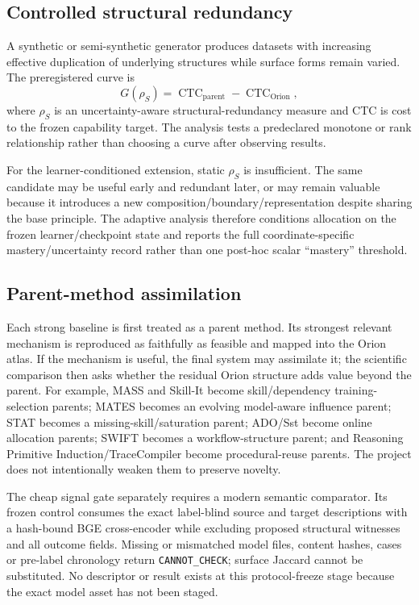 \subsection{Controlled structural redundancy}

A synthetic or semi-synthetic generator produces datasets with increasing effective duplication of underlying structures while surface forms remain varied. The preregistered curve is
\[
G(\rho_S)=\operatorname{CTC}_{\mathrm{parent}}-\operatorname{CTC}_{\mathrm{Orion}},
\]
where $\rho_S$ is an uncertainty-aware structural-redundancy measure and CTC is cost to the frozen capability target. The analysis tests a predeclared monotone or rank relationship rather than choosing a curve after observing results.

For the learner-conditioned extension, static $\rho_S$ is insufficient. The same candidate may be useful early and redundant later, or may remain valuable because it introduces a new composition/boundary/representation despite sharing the base principle. The adaptive analysis therefore conditions allocation on the frozen learner/checkpoint state and reports the full coordinate-specific mastery/uncertainty record rather than one post-hoc scalar ``mastery'' threshold.

\subsection{Parent-method assimilation}

Each strong baseline is first treated as a parent method. Its strongest relevant mechanism is reproduced as faithfully as feasible and mapped into the Orion atlas. If the mechanism is useful, the final system may assimilate it; the scientific comparison then asks whether the residual Orion structure adds value beyond the parent. For example, MASS and Skill-It become skill/dependency training-selection parents; MATES becomes an evolving model-aware influence parent; STAT becomes a missing-skill/saturation parent; ADO/Sst become online allocation parents; SWIFT becomes a workflow-structure parent; and Reasoning Primitive Induction/TraceCompiler become procedural-reuse parents. The project does not intentionally weaken them to preserve novelty.

The cheap signal gate separately requires a modern semantic comparator.  Its frozen control consumes the exact label-blind source and target descriptions with a hash-bound BGE cross-encoder while excluding proposed structural witnesses and all outcome fields. Missing or mismatched model files, content hashes, cases or pre-label chronology return \texttt{CANNOT\_CHECK}; surface Jaccard cannot be substituted. No descriptor or result exists at this protocol-freeze stage because the exact model asset has not been staged.

